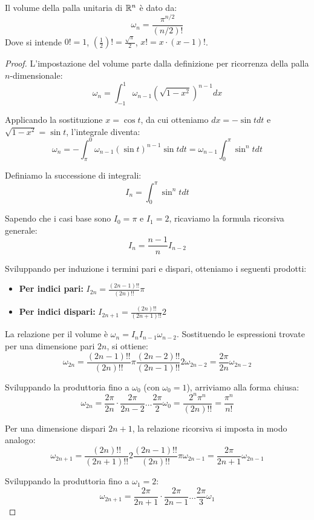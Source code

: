 
\begin{exercise}
Il volume della palla unitaria di ${\mathbb R}^n$ è dato da:
\[
  \omega_n = \frac{\pi^{n/2}}{(n/2)!}
\]
Dove si intende $0!=1$, $(\frac 1 2)!=\frac{\sqrt{\pi}}{2}$, 
$x! = x \cdot (x-1)!$.
\end{exercise}
\begin{proof}
L'impostazione del volume parte dalla definizione per ricorrenza della palla $n$-dimensionale:
$$\omega_n = \int_{-1}^1 \omega_{n-1} (\sqrt{1-x^2})^{n-1} dx$$

Applicando la sostituzione $x = \cos t$, da cui otteniamo $dx = -\sin t dt$ e $\sqrt{1-x^2} = \sin t$, l'integrale diventa:
$$\omega_n = -\int_{\pi}^0 \omega_{n-1} (\sin t)^{n-1} \sin t dt = \omega_{n-1} \int_0^{\pi} \sin^n t dt$$

Definiamo la successione di integrali:
$$I_n = \int_0^{\pi} \sin^n t dt$$

Sapendo che i casi base sono $I_0 = \pi$ e $I_1 = 2$, ricaviamo la formula ricorsiva generale:
$$I_n = \frac{n-1}{n} I_{n-2}$$

Sviluppando per induzione i termini pari e dispari, otteniamo i seguenti prodotti:
\begin{itemize}
    \item \textbf{Per indici pari:} $I_{2n} = \frac{(2n-1)!!}{(2n)!!} \pi$
    \item \textbf{Per indici dispari:} $I_{2n+1} = \frac{(2n)!!}{(2n+1)!!} 2$
\end{itemize}

La relazione per il volume è $\omega_n = I_n I_{n-1} \omega_{n-2}$. Sostituendo le espressioni trovate per una dimensione pari $2n$, si ottiene:
$$\omega_{2n} = \frac{(2n-1)!!}{(2n)!!} \pi \frac{(2n-2)!!}{(2n-1)!!} 2 \omega_{2n-2} = \frac{2\pi}{2n} \omega_{2n-2}$$

Sviluppando la produttoria fino a $\omega_0$ (con $\omega_0 = 1$), arriviamo alla forma chiusa:
$$\omega_{2n} = \frac{2\pi}{2n} \cdot \frac{2\pi}{2n-2} \dots \frac{2\pi}{2} \omega_0 = \frac{2^n \pi^n}{(2n)!!} = \frac{\pi^n}{n!}$$

Per una dimensione dispari $2n+1$, la relazione ricorsiva si imposta in modo analogo:
$$\omega_{2n+1} = \frac{(2n)!!}{(2n+1)!!} 2 \frac{(2n-1)!!}{(2n)!!} \pi \omega_{2n-1} = \frac{2\pi}{2n+1} \omega_{2n-1}$$

Sviluppando la produttoria fino a $\omega_1 = 2$:
$$\omega_{2n+1} = \frac{2\pi}{2n+1} \cdot \frac{2\pi}{2n-1} \dots \frac{2\pi}{3} \omega_1$$


\end{proof}
